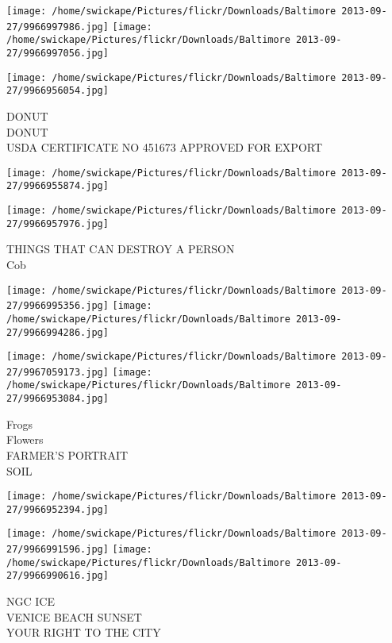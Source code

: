 \documentclass[10pt,letterpaper]{article}
\begin{document}
\texttt{[image: /home/swickape/Pictures/flickr/Downloads/Baltimore 2013-09-27/9966997986.jpg]}
\texttt{[image: /home/swickape/Pictures/flickr/Downloads/Baltimore 2013-09-27/9966997056.jpg]}

\vspace{0.25in}
\texttt{[image: /home/swickape/Pictures/flickr/Downloads/Baltimore 2013-09-27/9966956054.jpg]}

DONUT\\
DONUT\\
USDA CERTIFICATE NO 451673 APPROVED FOR EXPORT\\
\pagebreak

\texttt{[image: /home/swickape/Pictures/flickr/Downloads/Baltimore 2013-09-27/9966955874.jpg]}

\vspace{0.25in}
\texttt{[image: /home/swickape/Pictures/flickr/Downloads/Baltimore 2013-09-27/9966957976.jpg]}

THINGS THAT CAN DESTROY A PERSON\\
Cob\\
\pagebreak

\texttt{[image: /home/swickape/Pictures/flickr/Downloads/Baltimore 2013-09-27/9966995356.jpg]}
\texttt{[image: /home/swickape/Pictures/flickr/Downloads/Baltimore 2013-09-27/9966994286.jpg]}

\texttt{[image: /home/swickape/Pictures/flickr/Downloads/Baltimore 2013-09-27/9967059173.jpg]}
\texttt{[image: /home/swickape/Pictures/flickr/Downloads/Baltimore 2013-09-27/9966953084.jpg]}

Frogs\\
Flowers\\
FARMER'S PORTRAIT\\
SOIL\\
\pagebreak

\texttt{[image: /home/swickape/Pictures/flickr/Downloads/Baltimore 2013-09-27/9966952394.jpg]}

\vspace{0.25in}
\texttt{[image: /home/swickape/Pictures/flickr/Downloads/Baltimore 2013-09-27/9966991596.jpg]}
\texttt{[image: /home/swickape/Pictures/flickr/Downloads/Baltimore 2013-09-27/9966990616.jpg]}

NGC ICE\\
VENICE BEACH SUNSET\\
YOUR RIGHT TO THE CITY\\
\pagebreak
\end{document}
